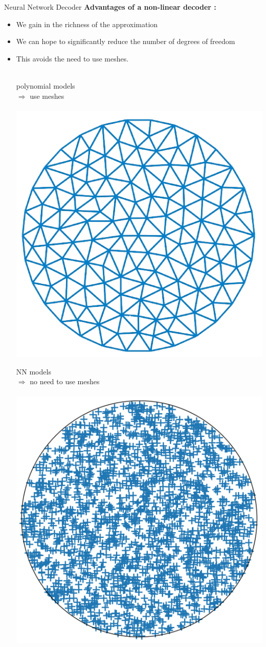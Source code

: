 \begin{frame}{Neural Network Decoder}
	\textbf{Advantages of a non-linear decoder :}
	\begin{itemize}[\textbullet]
		\item We gain in the richness of the approximation
		\item We can hope to significantly reduce the number of degrees of freedom
		\item This avoids the need to use meshes. \\ \; \\
		
		\begin{center}
			\begin{minipage}{0.4\linewidth}
				polynomial models \\
				$\Rightarrow$ use meshes \\ \; \\
				\centering
				\includegraphics[width=0.6\linewidth]{images/pinns/nonlineardecoder_mesh.png}
			\end{minipage} \quad \vline \quad
			\begin{minipage}{0.4\linewidth}
				NN models \\
				$\Rightarrow$ no need to use meshes \\ \; \\
				\centering
				\includegraphics[width=0.6\linewidth]{images/pinns/nonlineardecoder_random.png}
			\end{minipage}
		\end{center}
	\end{itemize}
\end{frame}

